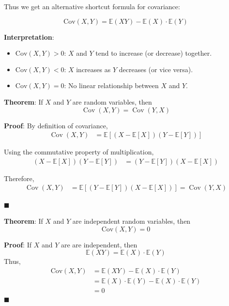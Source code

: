\documentclass[twoside]{book}
\begin{document}
Thus we get an alternative shortcut formula for covariance:

\begin{textbox}
\[
\mathrm{Cov}(X, Y) = \mathbb{E}(XY) - \mathbb{E}(X) \cdot \mathbb{E}(Y)
\]
\end{textbox}

\textbf{Interpretation}:

\begin{itemize}
  \item \( \mathrm{Cov}(X, Y) > 0 \): \( X \) and \( Y \) tend to increase (or decrease) together.
  \item \( \mathrm{Cov}(X, Y) < 0 \): \( X \) increases as \( Y \) decreases (or vice versa).
  \item \( \mathrm{Cov}(X, Y) = 0 \): No linear relationship between \( X \) and \( Y \).
\end{itemize}

\begin{textbox}
\textbf{Theorem}: If $X$ and $Y$ are random variables, then
\[
\operatorname{Cov}(X, Y) = \operatorname{Cov}(Y, X)
\]
\end{textbox}


\textbf{Proof}: By definition of covariance,
\begin{align*}
\operatorname{Cov}(X, Y) &= \mathbb{E}[(X - \mathbb{E}[X])(Y - \mathbb{E}[Y])]
\end{align*}

Using the commutative property of multiplication,
\begin{align*}
(X - \mathbb{E}[X])(Y - \mathbb{E}[Y]) &= (Y - \mathbb{E}[Y])(X - \mathbb{E}[X])
\end{align*}

Therefore,
\begin{align*}
\operatorname{Cov}(X, Y) &= \mathbb{E}[(Y - \mathbb{E}[Y])(X - \mathbb{E}[X])] = \operatorname{Cov}(Y, X)
\end{align*}

\hfill $\blacksquare$

\begin{textbox}
\textbf{Theorem}: If \( X \) and \( Y \) are independent random variables, then
\[
\mathrm{Cov}(X, Y) = 0
\]
\end{textbox}

\textbf{Proof}: If $X$ and $Y$ are are independent, then
$$\mathbb{E}(XY) = \mathbb{E}(X)\cdot \mathbb{E}(Y)$$
Thus,
\begin{align*}
\mathrm{Cov}(X, Y) &= \mathbb{E}(XY) - \mathbb{E}(X) \cdot \mathbb{E}(Y)\\
&=\mathbb{E}(X) \cdot \mathbb{E}(Y) - \mathbb{E}(X) \cdot \mathbb{E}(Y)\\
&=0
\end{align*}
\hfill\(\blacksquare\)
\end{document}
